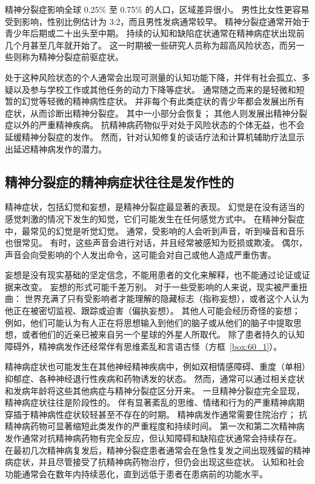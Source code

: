 精神分裂症影响全球 0.25\% 至 0.75\% 的人口，区域差异很小。
男性比女性更容易受到影响，性别比例估计为 3:2，而且男性发病通常较早。
精神分裂症通常开始于青少年后期或二十出头至中期。
持续的认知和缺陷症状通常在精神病症状出现前几个月甚至几年就开始了。
这一时期被一些研究人员称为超高风险状态，而另一些则称为精神分裂症前驱症状。


处于这种风险状态的个人通常会出现可测量的认知功能下降，并伴有社会孤立、多疑以及参与学校工作或其他任务的动力下降等症状。
通常随之而来的是轻微和短暂的幻觉等轻微的精神病性症状。
并非每个有此类症状的青少年都会发展出所有症状，从而诊断出精神分裂症。
其中一小部分会恢复；
其他人则发展出精神分裂症以外的严重精神疾病。
抗精神病药物似乎对处于风险状态的个体无益，也不会延缓精神分裂症的发作。
然而，针对认知修复的谈话疗法和计算机辅助疗法显示出延迟精神病发作的潜力。



\subsection{精神分裂症的精神病症状往往是发作性的}

精神症状，包括幻觉和妄想，是精神分裂症最显著的表现。
幻觉是在没有适当的感觉刺激的情况下发生的知觉，它们可能发生在任何感觉方式中。
在精神分裂症中，最常见的幻觉是听觉幻觉。
通常，受影响的人会听到声音，听到噪音和音乐也很常见。
有时，这些声音会进行对话，并且经常被感知为贬损或欺凌。
偶尔，声音会向受影响的个人发出命令，这可能会对自己或他人造成严重伤害。


妄想是没有现实基础的坚定信念，不能用患者的文化来解释，也不能通过论证或证据来改变。
妄想的形式可能千差万别。 对于一些受影响的人来说，现实被严重扭曲：
世界充满了只有受影响者才能理解的隐藏标志（指称妄想），或者这个人认为他正在被密切监视、跟踪或迫害（偏执妄想）。
其他人可能会经历奇怪的妄想；
例如，他们可能认为有人正在将思想输入到他们的脑子或从他们的脑子中提取思想，或者他们的近亲已被来自另一个星球的外星人所取代。
除了患者持久的认知障碍外，精神病发作还经常伴有思维紊乱和言语古怪（方框~\ref{box:60_1}）。


精神病症状也可能发生在其他神经精神疾病中，例如双相情感障碍、重度（单相）抑郁症、各种神经退行性疾病和药物诱发的状态。
然而，通常可以通过相关症状和发病年龄将这些其他病症与精神分裂症区分开来。
一旦精神分裂症完全显现，精神病症状往往是阶段性的。
伴有显著紊乱的思维、情绪和行为的严重精神病期穿插于精神病性症状较轻甚至不存在的时期。
精神病发作通常需要住院治疗；
抗精神病药物可显著缩短此类发作的严重程度和持续时间。
第一次和第二次精神病发作通常对抗精神病药物有完全反应，但认知障碍和缺陷症状通常会持续存在。
在最初几次精神病复发后，精神分裂症患者通常会在急性复发之间出现残留的精神病症状，并且尽管接受了抗精神病药物治疗，但仍会出现这些症状。
认知和社会功能通常会在数年内持续恶化，直到远低于患者在患病前的功能水平。



